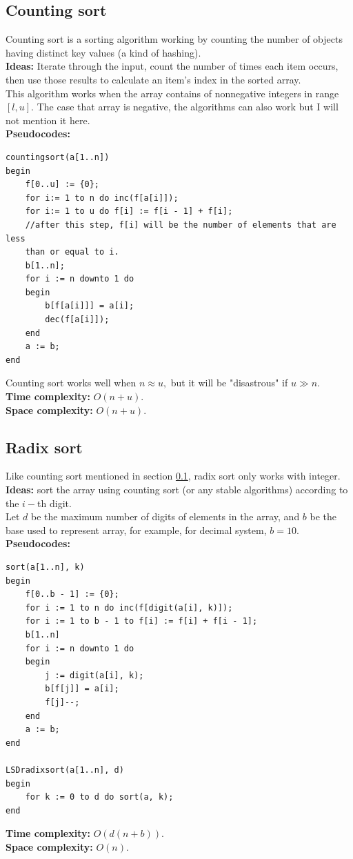 \documentclass[12pt,a4paper]{article}
\begin{document}
\subsection{Counting sort}
\label{countingsort}
Counting sort is a sorting algorithm working by counting the number of objects having distinct key values (a kind of hashing). \cite{count}\\
\textbf{Ideas:} Iterate through the input, count the number of times each item occurs, then use those results to calculate an item's index in the sorted array. \cite{counting}\\
This algorithm works when the array contains of nonnegative integers in range $\left[ {l, u} \right].$ The case that array is negative, the algorithms can also work but I will not mention it here.\\
\textbf{Pseudocodes:} \cite{thayP}
\lstset{language=Pascal} 
\begin{lstlisting}[caption = {Counting sort}]
countingsort(a[1..n])
begin
	f[0..u] := {0};
	for i:= 1 to n do inc(f[a[i]]);
	for i:= 1 to u do f[i] := f[i - 1] + f[i];
	//after this step, f[i] will be the number of elements that are less 
	than or equal to i.
	b[1..n];
	for i := n downto 1 do
	begin
		b[f[a[i]]] = a[i];
		dec(f[a[i]]);
	end
	a := b;
end
\end{lstlisting}
Counting sort works well when $n \approx u,$ but it will be "disastrous" if $u \gg n.$ \cite{thayP}\\
\textbf{Time complexity:} $O \left( {n + u} \right).$ \cite{count}\\
\textbf{Space complexity:} $O \left( {n + u} \right).$ \cite{count}

\subsection{Radix sort}
Like counting sort mentioned in section \ref{countingsort}, radix sort only works with integer.\\
\textbf{Ideas:} sort the array using counting sort (or any stable algorithms) according to the $i-$th digit. \cite{radix}\\
Let $d$ be the maximum number of digits of elements in the array, and $b$ be the base used to represent array, for example, for decimal system, $b = 10.$\\
\textbf{Pseudocodes:} \cite{thayP}
\lstset{language=Pascal} 
\begin{lstlisting}[caption = {Radix sort}]
sort(a[1..n], k)
begin
	f[0..b - 1] := {0};
	for i := 1 to n do inc(f[digit(a[i], k)]);
	for i := 1 to b - 1 to f[i] := f[i] + f[i - 1];
	b[1..n]
	for i := n downto 1 do
	begin
		j := digit(a[i], k);
		b[f[j]] = a[i];
		f[j]--;
	end
	a := b;
end

LSDradixsort(a[1..n], d)
begin
	for k := 0 to d do sort(a, k);
end
\end{lstlisting}
\textbf{Time complexity:} $O \left( {d \left( {n + b} \right)} \right).$ \cite{radix}\\
\textbf{Space complexity:} $O \left( n \right).$ \cite{radix}
\end{document}
